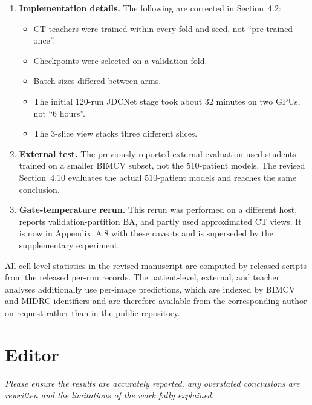 \documentclass[11pt]{article}
\newenvironment{rcomment}{\par\noindent\begin{minipage}{\linewidth}\itshape\color{black!75}}{\end{minipage}\par}
\begin{document}
\begin{enumerate}[leftmargin=1.6em]
  \item \textbf{Implementation details.} The following are corrected in Section~4.2:
  \begin{itemize}[leftmargin=1.2em]
    \item CT teachers were trained within every fold and seed, not ``pre-trained once''.
    \item Checkpoints were selected on a validation fold.
    \item Batch sizes differed between arms.
    \item The initial 120-run JDCNet stage took about 32 minutes on two GPUs, not ``6 hours''.
    \item The 3-slice view stacks three different slices.
  \end{itemize}
  \item \textbf{External test.} The previously reported external evaluation used students trained on a smaller BIMCV subset, not the 510-patient models. The revised Section~4.10 evaluates the actual 510-patient models and reaches the same conclusion.
  \item \textbf{Gate-temperature rerun.} This rerun was performed on a different host, reports validation-partition BA, and partly used approximated CT views. It is now in Appendix~A.8 with these caveats and is superseded by the supplementary experiment.
\end{enumerate}

All cell-level statistics in the revised manuscript are computed by released scripts from
the released per-run records. The patient-level, external, and teacher analyses
additionally use per-image predictions, which are indexed by BIMCV and MIDRC
identifiers and are therefore available from the corresponding author on
request rather than in the public repository.

\hrulefill

\section*{Editor}

\begin{rcomment}
Please ensure the results are accurately reported, any overstated conclusions are rewritten and the limitations of the work fully explained.
\end{rcomment}
\end{document}
